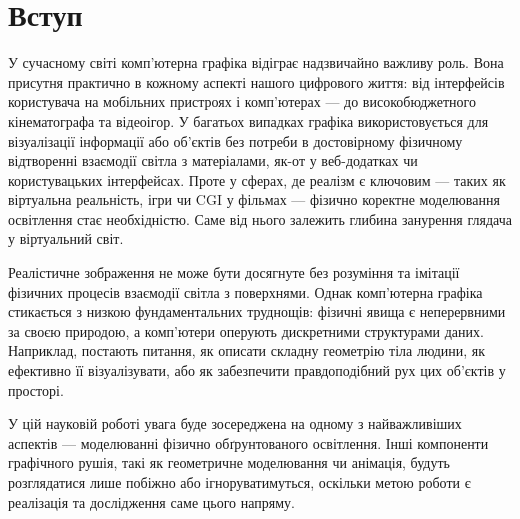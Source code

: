 
 \normalsize
 \chapter*{Вступ}
У сучасному світі комп’ютерна графіка відіграє надзвичайно важливу роль. Вона присутня практично в кожному аспекті нашого цифрового життя: від інтерфейсів 
користувача на мобільних пристроях і комп’ютерах — до високобюджетного кінематографа та відеоігор. У багатьох випадках графіка використовується для візуалізації
 інформації або об'єктів без потреби в достовірному фізичному відтворенні взаємодії світла з матеріалами, як-от у веб-додатках чи користувацьких інтерфейсах. 
 Проте у сферах, де реалізм є ключовим — таких як віртуальна реальність, ігри чи CGI у фільмах — фізично коректне моделювання освітлення стає необхідністю. Саме
  від нього залежить глибина занурення глядача у віртуальний світ.

\par Реалістичне зображення не може бути досягнуте без розуміння та імітації фізичних процесів взаємодії світла з поверхнями. 
Однак комп’ютерна графіка стикається з низкою фундаментальних труднощів: фізичні явища є неперервними за своєю природою, а комп’ютери оперують 
дискретними структурами даних. Наприклад, постають питання, як описати складну геометрію тіла людини, як ефективно її візуалізувати, або як забезпечити
 правдоподібний рух цих об'єктів у просторі.

\par У цій науковій роботі увага буде зосереджена на одному з найважливіших аспектів — моделюванні фізично обґрунтованого освітлення. 
Інші компоненти графічного рушія, такі як геометричне моделювання чи анімація, будуть розглядатися лише побіжно або ігноруватимуться, оскільки 
метою роботи є реалізація та дослідження саме цього напряму.
 
